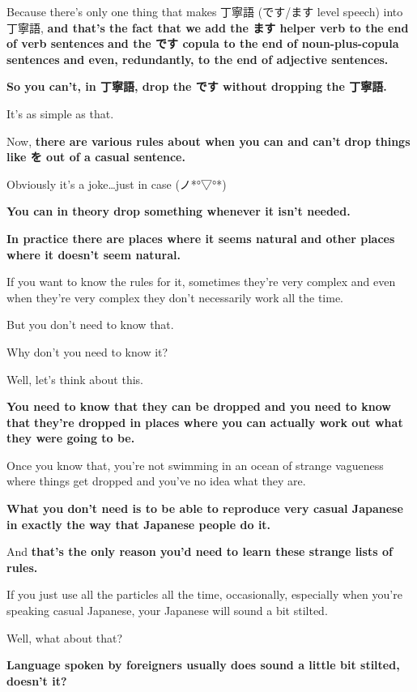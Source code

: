Because there's only one thing that makes 丁寧語 (です/ます level speech) into 丁寧語, {\bf and that's the fact that we add the ます helper verb to the end of verb sentences} {\bf and the です copula to the end of noun-plus-copula sentences} {\bf and even, redundantly, to the end of adjective sentences.}

{\bf So you can't, in 丁寧語, drop the です without dropping the 丁寧語.}

It's as simple as that.

\thinrule

Now, {\bf there are various rules about when you can and can't} {\bf drop things like を out of a casual sentence.}

{}

Obviously it's a joke\ldots{}just in case (ノ*°▽°*)

{\bf You can in theory drop something whenever it isn't needed.}

{\bf In practice there are places where it seems natural} {\bf and other places where it doesn't seem natural.}

If you want to know the rules for it, sometimes they're very complex and even when they're very complex they don't necessarily work all the time.

But you don't need to know that.

Why don't you need to know it?

Well, let's think about this.

{\bf You need to know that they can be dropped and you need to know that} {\bf they're dropped in places where you can actually work out what they were going to be.}

Once you know that, you're not swimming in an ocean of strange vagueness where things get dropped and you've no idea what they are.

{\bf What you don't need is to be able to reproduce very casual Japanese} {\bf in exactly the way that Japanese people do it.}

And {\bf that's the only reason you'd need to learn these strange lists of rules.}

If you just use all the particles all the time, occasionally, especially when you're speaking casual Japanese, your Japanese will sound a bit stilted.

Well, what about that?

{\bf Language spoken by foreigners usually does sound a little bit stilted, doesn't it?}

